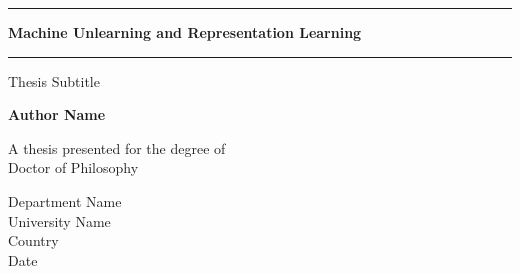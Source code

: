 \begin{titlepage}
   \begin{center}
       \vspace*{1cm}


        \noindent\rule{14cm}{0.6pt}
        
        \vspace{10pt}

        {\Large 
       \textbf{Machine Unlearning and Representation Learning}
        }
    
        \vspace{10pt}

        \noindent\rule{14cm}{0.6pt}

       \vspace{0.5cm}
        Thesis Subtitle
            
       \vspace{1.5cm}

       \textbf{Author Name}

       \vfill
            
       A thesis presented for the degree of\\
       Doctor of Philosophy
            
       \vspace{0.8cm}
     
            
       Department Name\\
       University Name\\
       Country\\
       Date
            
   \end{center}
\end{titlepage}